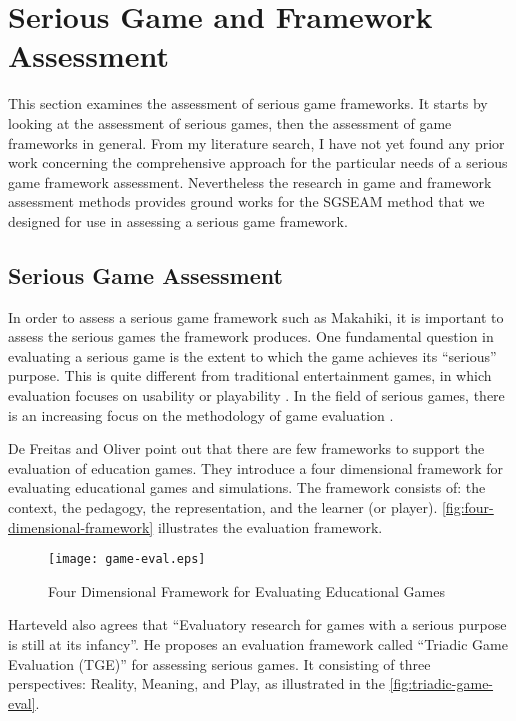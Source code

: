 \section{Serious Game and Framework Assessment}
\label{sec:rel-sg-assessment}

This section examines the assessment of serious game frameworks. It starts by looking at the assessment of serious games, then  the assessment of game frameworks in general. From my literature search, I have not yet found any prior work concerning the comprehensive approach for the particular needs of a serious game framework assessment. Nevertheless the research in game and framework assessment methods provides ground works for the SGSEAM method that we designed for use in assessing a serious game framework.

\subsection{Serious Game Assessment}

In order to assess a serious game framework such as Makahiki, it is important to assess the serious games the framework produces.  One fundamental question in evaluating a serious game is the extent to which the
game achieves its ``serious'' purpose.  This is quite different from traditional entertainment games, in which evaluation focuses on usability or playability \cite{song2007new}. In the field of serious games, there is an increasing focus on the methodology of game evaluation \cite{Mayer2012233}. 

De Freitas and Oliver \cite{de2006can} point out that there are few frameworks to support the evaluation of education games. They introduce a four dimensional framework for evaluating 
educational games and simulations. The framework consists of: the context, the pedagogy, the representation, and the learner (or player). \autoref{fig:four-dimensional-framework} illustrates the evaluation framework.

\begin{figure}[ht!]
	\centering
		\texttt{[image: game-eval.eps]}
		\caption{Four Dimensional Framework for Evaluating Educational Games \cite{de2006can}}
		\label{fig:four-dimensional-framework}
\end{figure}

Harteveld \cite{harteveld2010triadic} also agrees that ``Evaluatory research for games with a serious purpose is still at its infancy''. He proposes an evaluation framework called ``Triadic Game Evaluation (TGE)'' for assessing serious games. It consisting of three perspectives: Reality,
Meaning, and Play, as illustrated in the \autoref{fig:triadic-game-eval}.

